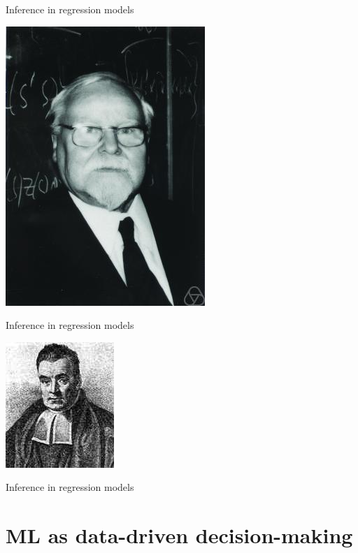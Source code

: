 \documentclass[10pt]{beamer}
\def\figdir{Figures}
\begin{document}
  \begin{frame}{Inference in regression models}
    \vspace{-1.5cm}
    \begin{flushright}
      \includegraphics[width=\threefig]{Figures/tykhonov.jpg}
    \end{flushright}
    \vfill 
  \end{frame}
  
  \begin{frame}{Inference in regression models}
    \vspace{-1.5cm}
    \begin{flushright}
      \includegraphics[width=\threefig]{Figures/bayes}
    \end{flushright}
    \vfill 
  \end{frame}
  
  \begin{frame}{Inference in regression models}
  \end{frame}
  

\section{ML as data-driven decision-making}
\end{document}
